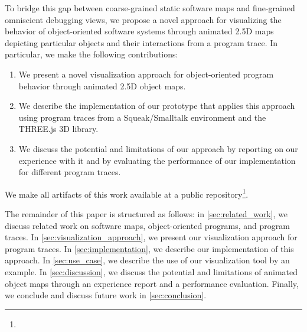 To bridge this gap between coarse-grained static software maps and fine-grained omniscient debugging views, we propose a novel approach for visualizing the behavior of object-oriented software systems through animated 2.5D maps depicting particular objects and their interactions from a program trace.
In particular, we make the following contributions:

\begin{enumerate}
	\item We present a novel visualization approach for ob\-ject-ori\-ent\-ed program behavior through animated 2.5D object maps.
	\item We describe the implementation of our prototype \tfd{} that applies this approach using program traces from a Squeak/\?Smalltalk environment and the THREE.js 3D library.
	\item We discuss the potential and limitations of our approach by reporting on our experience with it and by evaluating the performance of our implementation for different program traces.
\end{enumerate}

We make all artifacts of this work available at a public repository\footnote{}.

The remainder of this paper is structured as follows:
in \cref{sec:related_work}, we discuss related work on software maps, object-oriented programs, and program traces.
In \cref{sec:visualization_approach}, we present our visualization approach for program traces.
In \cref{sec:implementation}, we describe our implementation of this approach.
In \cref{sec:use_case}, we describe the use of our visualization tool by an example.
In \cref{sec:discussion}, we discuss the potential and limitations of animated object maps through an experience report and a performance evaluation.
Finally, we conclude and discuss future work in \cref{sec:conclusion}.
